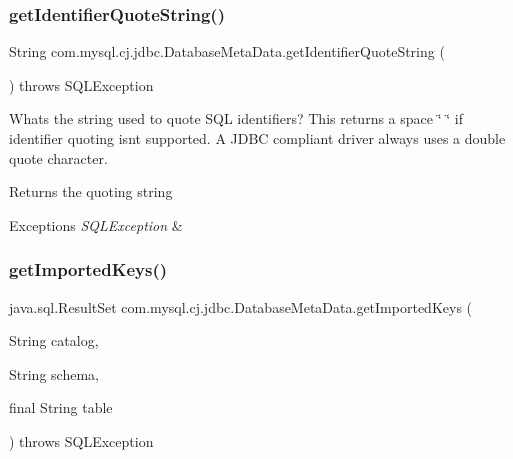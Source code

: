 \subsubsection{\texorpdfstring{get\+Identifier\+Quote\+String()}{getIdentifierQuoteString()}}
{\footnotesize\ttfamily String com.\+mysql.\+cj.\+jdbc.\+Database\+Meta\+Data.\+get\+Identifier\+Quote\+String (\begin{DoxyParamCaption}{ }\end{DoxyParamCaption}) throws S\+Q\+L\+Exception}

What\textquotesingle{}s the string used to quote S\+QL identifiers? This returns a space \char`\"{} \char`\"{} if identifier quoting isn\textquotesingle{}t supported. A J\+D\+BC compliant driver always uses a double quote character.

\begin{DoxyReturn}{Returns}
the quoting string 
\end{DoxyReturn}

\begin{DoxyExceptions}{Exceptions}
{\em S\+Q\+L\+Exception} & \\
\hline
\end{DoxyExceptions}
\mbox{\label{classcom_1_1mysql_1_1cj_1_1jdbc_1_1_database_meta_data_adc8fcceec522ea001113c716efd56c16}} 
\subsubsection{\texorpdfstring{get\+Imported\+Keys()}{getImportedKeys()}}
{\footnotesize\ttfamily java.\+sql.\+Result\+Set com.\+mysql.\+cj.\+jdbc.\+Database\+Meta\+Data.\+get\+Imported\+Keys (\begin{DoxyParamCaption}\item[{String}]{catalog,  }\item[{String}]{schema,  }\item[{final String}]{table }\end{DoxyParamCaption}) throws S\+Q\+L\+Exception}

\mbox{\label{classcom_1_1mysql_1_1cj_1_1jdbc_1_1_database_meta_data_ad10a46147a3e514a235c7069c68bc0c1}} 
